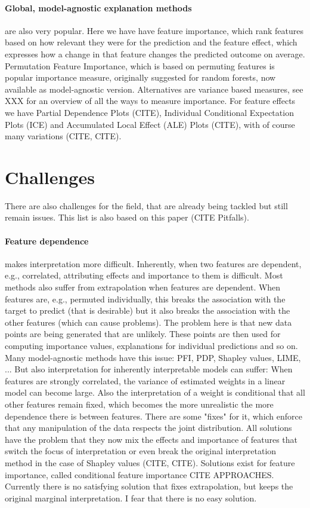 \documentclass[runningheads]{llncs}
\begin{document}
\paragraph{Global, model-agnostic explanation methods} are also very popular.
Here we have have feature importance, which rank features based on how relevant they were for the prediction and the feature effect, which expresses how a change in that feature changes the predicted outcome on average.
Permutation Feature Importance, which is based on permuting features is popular importance measure, originally suggested for random forests, now available as model-agnostic version.
Alternatives are variance based measures, see XXX for an overview of all the ways to measure importance.
For feature effects we have Partial Dependence Plots (CITE), Individual Conditional Expectation Plots (ICE) and Accumulated Local Effect (ALE) Plots (CITE), with of course many variations (CITE, CITE).


\section{Challenges}

There are also challenges for the field, that are already being tackled but still remain issues.
This list is also based on this paper (CITE Pitfalls).

\paragraph{Feature dependence} makes interpretation more difficult.
Inherently, when two features are dependent, e.g., correlated, attributing effects and importance to them is difficult.
Most methods also suffer from extrapolation when features are dependent.
When features are, e.g., permuted individually, this breaks the association with the target to predict (that is desirable) but it also breaks the association with the other features (which can cause problems).
The problem here is that new data points are being generated that are unlikely.
These points are then used for computing importance values, explanations for individual predictions and so on.
Many model-agnostic methods have this issue: PFI, PDP, Shapley values, LIME, ...
But also interpretation for inherently interpretable models can suffer:
When features are strongly correlated, the variance of estimated weights in a linear model can become large.
Also the interpretation of a weight is conditional that all other features remain fixed, which becomes the more unrealistic the more dependence there is between features.
There are some "fixes" for it, which enforce that any manipulation of the data respects the joint distribution.
All solutions have the problem that they now mix the effects and importance of features that switch the focus of interpretation or even break the original interpretation method in the case of Shapley values (CITE, CITE).
Solutions exist for feature importance, called conditional feature importance CITE APPROACHES.
Currently there is no satisfying solution that fixes extrapolation, but keeps the original marginal interpretation.
I fear that there is no easy solution.
\end{document}
